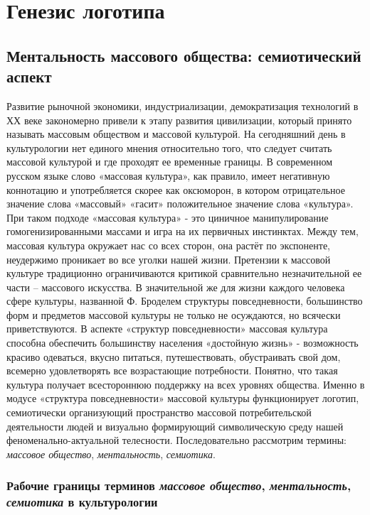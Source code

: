 \section{Генезис логотипа}\label{chapter1}

\subsection{Ментальность массового общества: семиотический аспект}\label{1}
Развитие рыночной экономики, индустриализации, демократизация технологий в ХХ веке закономерно привели к этапу развития цивилизации, который принято называть массовым обществом и массовой культурой. На сегодняшний день в культурологии нет единого мнения относительно того, что следует считать массовой культурой и где проходят ее временные границы. В современном русском языке слово «массовая культура», как правило, имеет негативную коннотацию и употребляется скорее как оксюморон, в котором отрицательное значение слова «массовый» «гасит» положительное значение слова «культура». \autocite{elistratov2012} При таком подходе «массовая культура» - это циничное манипулирование гомогенизированными массами и игра на их первичных инстинктах. Между тем, массовая культура окружает нас со всех сторон, она растёт по экспоненте, неудержимо проникает во все уголки нашей жизни. Претензии к массовой культуре традиционно ограничиваются критикой сравнительно незначительной ее части – массового искусства. В значительной же для жизни каждого человека сфере культуры, названной Ф. Броделем структуры повседневности, большинство форм и предметов массовой культуры не только не  осуждаются, но всячески приветствуются. В аспекте «структур повседневности» массовая культура способна обеспечить большинству населения «достойную жизнь» - возможность красиво одеваться, вкусно питаться, путешествовать, обустраивать свой дом, всемерно удовлетворять все возрастающие потребности. Понятно, что такая культура получает всестороннюю поддержку на всех уровнях общества. Именно в модусе «структура повседневности» массовой культуры функционирует логотип, семиотически организующий пространство массовой потребительской деятельности людей и визуально формирующий символическую среду нашей феноменально-актуальной телесности. Последовательно рассмотрим термины: \emph{массовое общество}, \emph{ментальность},
\emph{семиотика}.\autocite{society}

\subsubsection{Рабочие границы терминов \emph{массовое общество}, \emph{ментальность}, \emph{семиотика} в культурологии}\label{1.1} 
